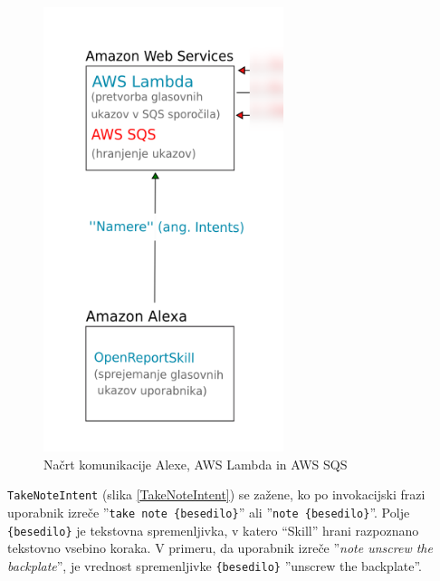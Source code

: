 \documentclass[a4paper, 12pt]{book}
\begin{document}
\begin{figure}[H]
\begin{center}
\includegraphics[width=7cm]{plan_alexa_sqs}
\end{center}
\caption{Načrt komunikacije Alexe, AWS Lambda in AWS SQS}
\label{plan_alexa_sqs}
\end{figure}

\texttt{TakeNoteIntent} (slika \ref{TakeNoteIntent}) se zažene, ko po invokacijski frazi uporabnik izreče ''\texttt{take note \{besedilo\}}'' ali ''\texttt{note \{besedilo\}}''.
Polje \texttt{\{besedilo\}} je tekstovna spremenljivka, v katero \enquote{Skill} hrani razpoznano tekstovno vsebino koraka.
V primeru, da uporabnik izreče ''\textit{note unscrew the backplate}'', je vrednost spremenljivke \texttt{\{besedilo\}} ''unscrew the backplate''.
\end{document}
